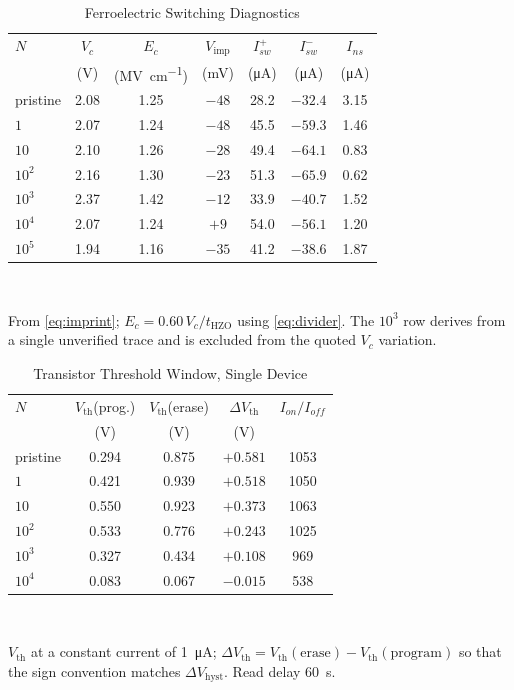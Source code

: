 \documentclass[journal]{IEEEtran}
\newcommand{\rev}[1]{#1}                    %
\newcommand{\Ec}{E_c}
\newcommand{\Vc}{V_c}
\newcommand{\Vth}{V_{\mathrm{th}}}
\newcommand{\Vimp}{V_{\mathrm{imp}}}
\newcommand{\dVh}{\Delta V_{\mathrm{hyst}}}
\newcommand{\MVcm}{\mega\volt\per\centi\meter}
\begin{document}
\begin{table}[!t]
\caption{Ferroelectric Switching Diagnostics}
\label{tab:switch}\centering\footnotesize\setlength{\tabcolsep}{4pt}
\begin{tabular}{lcccccc}
\toprule
$N$ & $\Vc$ & $\Ec$ & $\Vimp$ & $I_{sw}^{+}$ & $I_{sw}^{-}$ & $I_{ns}$\\
    & (V) & (\si{\MVcm}) & (mV) & (\si{\micro\ampere})
    & (\si{\micro\ampere}) & (\si{\micro\ampere})\\
\midrule
pristine & 2.08 & 1.25 & $-48$ & 28.2 & $-32.4$ & 3.15\\
$1$      & 2.07 & 1.24 & $-48$ & 45.5 & $-59.3$ & 1.46\\
$10$     & 2.10 & 1.26 & $-28$ & 49.4 & $-64.1$ & 0.83\\
$10^2$   & 2.16 & 1.30 & $-23$ & 51.3 & $-65.9$ & 0.62\\
$10^3$   & 2.37 & 1.42 & $-12$ & 33.9 & $-40.7$ & 1.52\\
$10^4$   & 2.07 & 1.24 & $+9$  & 54.0 & $-56.1$ & 1.20\\
$10^5$   & 1.94 & 1.16 & $-35$ & 41.2 & $-38.6$ & 1.87\\
\bottomrule
\end{tabular}\\[2pt]
\parbox{\columnwidth}{\scriptsize From \eqref{eq:imprint};
$\Ec=0.60\,\Vc/t_{\mathrm{HZO}}$ using \eqref{eq:divider}. The $10^3$
row derives from a single unverified trace and is excluded from the
quoted $\Vc$ variation.}
\end{table}

\begin{table}[!t]
\caption{\rev{Transistor Threshold Window, Single Device}}
\label{tab:vth}\centering\footnotesize\setlength{\tabcolsep}{5pt}
\begin{tabular}{lcccc}
\toprule
$N$ & $\Vth$(prog.) & $\Vth$(erase) & $\Delta\Vth$ & $I_{on}/I_{off}$\\
    & (V) & (V) & (V) & \\
\midrule
pristine & 0.294 & 0.875 & $+0.581$ & 1053\\
$1$      & 0.421 & 0.939 & $+0.518$ & 1050\\
$10$     & 0.550 & 0.923 & $+0.373$ & 1063\\
$10^2$   & 0.533 & 0.776 & $+0.243$ & 1025\\
$10^3$   & 0.327 & 0.434 & $+0.108$ & 969\\
$10^4$   & 0.083 & 0.067 & $-0.015$ & 538\\
\bottomrule
\end{tabular}\\[2pt]
\parbox{\columnwidth}{\scriptsize $\Vth$ at a constant current of
\SI{1}{\micro\ampere}; $\Delta\Vth=\Vth(\text{erase})-\Vth(\text{program})$
so that the sign convention matches $\dVh$. Read delay \SI{60}{\second}.}
\end{table}
\end{document}
